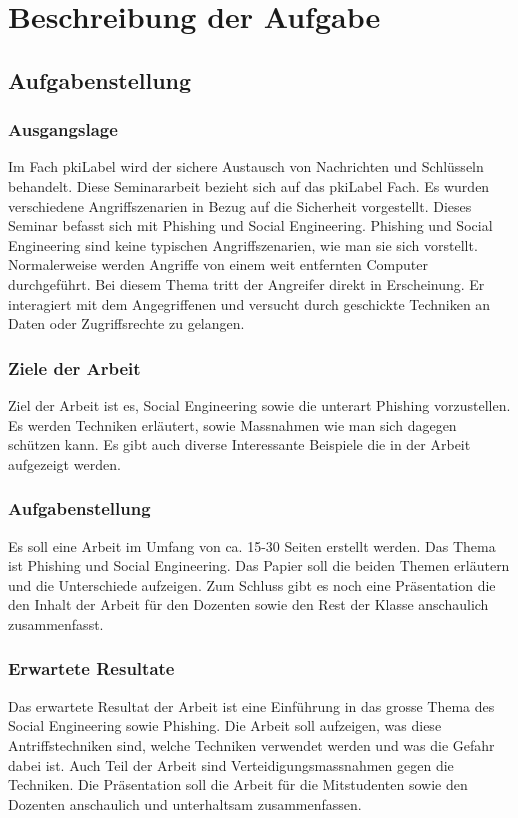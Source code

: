 \chapter{Beschreibung der Aufgabe}

\section{Aufgabenstellung}

\subsection{Ausgangslage}
Im Fach \Gls{pkiLabel} wird der sichere Austausch von Nachrichten und Schlüsseln behandelt. Diese Seminararbeit bezieht sich auf das \Gls{pkiLabel} Fach. Es wurden verschiedene Angriffszenarien in Bezug auf die Sicherheit vorgestellt. Dieses Seminar befasst sich mit Phishing und Social Engineering.
Phishing und Social Engineering sind keine typischen Angriffszenarien, wie man sie sich vorstellt. Normalerweise werden Angriffe von einem weit entfernten Computer durchgeführt. Bei diesem Thema tritt der Angreifer direkt in Erscheinung. Er interagiert mit dem Angegriffenen und versucht durch geschickte Techniken an Daten oder Zugriffsrechte zu gelangen. 

\subsection{Ziele der Arbeit}
Ziel der Arbeit ist es, Social Engineering sowie die unterart Phishing vorzustellen. Es werden Techniken erläutert, sowie Massnahmen wie man sich dagegen schützen kann. Es gibt auch diverse Interessante Beispiele die in der Arbeit aufgezeigt werden. 

\subsection{Aufgabenstellung}
Es soll eine Arbeit im Umfang von ca. 15-30 Seiten erstellt werden. Das Thema ist Phishing und Social Engineering. Das Papier soll die beiden Themen erläutern und die Unterschiede aufzeigen.
Zum Schluss gibt es noch eine Präsentation die den Inhalt der Arbeit für den Dozenten sowie den Rest der Klasse anschaulich zusammenfasst.

\subsection{Erwartete Resultate}
Das erwartete Resultat der Arbeit ist eine Einführung in das grosse Thema des Social Engineering sowie Phishing. Die Arbeit soll aufzeigen, was diese Antriffstechniken sind, welche Techniken verwendet werden und was die Gefahr dabei ist. Auch Teil der Arbeit sind Verteidigungsmassnahmen gegen die Techniken.
Die Präsentation soll die Arbeit für die Mitstudenten sowie den Dozenten anschaulich und unterhaltsam zusammenfassen.